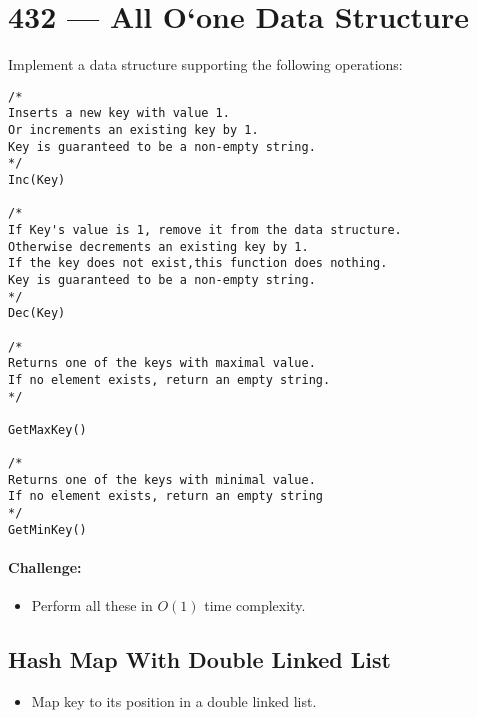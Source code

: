 \section{432 --- All O`one Data Structure}
Implement a data structure supporting the following operations:


\begin{lstlisting}[style=customc]
/*
Inserts a new key with value 1. 
Or increments an existing key by 1. 
Key is guaranteed to be a non-empty string.
*/
Inc(Key) 

/*
If Key's value is 1, remove it from the data structure. 
Otherwise decrements an existing key by 1. 
If the key does not exist,this function does nothing. 
Key is guaranteed to be a non-empty string.
*/
Dec(Key)

/*
Returns one of the keys with maximal value. 
If no element exists, return an empty string.
*/

GetMaxKey()

/*
Returns one of the keys with minimal value. 
If no element exists, return an empty string
*/
GetMinKey()
\end{lstlisting}

\paragraph{Challenge:} 
\begin{itemize}
\item Perform all these in $O(1)$ time complexity.
\end{itemize}

\subsection{Hash Map With Double Linked List}
\begin{itemize}
\item Map key to its position in a double linked list.
\end{itemize}

